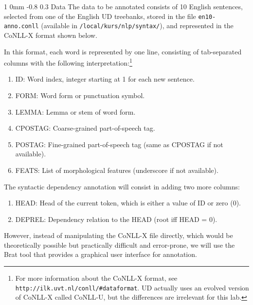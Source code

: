 \documentclass[10.9pt]{article}
\makeatletter
\newcommand{\newsec}[2]{\section{#1}\label{sec:#2}\noindent}
\renewcommand{\section}{\@startsection
{section}%
{1}%
{0mm}%
{-0.8\baselineskip}%
{0.3\baselineskip}%
{\bfseries\large}}%
\makeatother
\begin{document}
\newsec{Data}{data}%
The data to be annotated consists of 10 English sentences, selected from one of the English UD treebanks, stored in the file {\tt en10-anno.conll} 
(available in {\tt /local/kurs/nlp/syntax/}), and represented in the CoNLL-X format shown below.
\begin{center}
\fbox{

}
\end{center}
In this format, each word is represented by one line, consisting of tab-separated columns with the following interpretation:\footnote{For more information about the CoNLL-X format, see {\tt http://ilk.uvt.nl/conll/\#dataformat}. UD actually uses an evolved version of CoNLL-X called CoNLL-U, but the differences are irrelevant for this lab.} 
\begin{enumerate}[topsep=5pt,noitemsep]
\item ID: Word index, integer starting at 1 for each new sentence.
\item FORM: Word form or punctuation symbol.
\item LEMMA: Lemma or stem of word form.
\item CPOSTAG: Coarse-grained part-of-speech tag.
\item POSTAG: Fine-grained part-of-speech tag (same as CPOSTAG if not available).
\item FEATS: List of morphological features (underscore if not available).
\end{enumerate}
The syntactic dependency annotation will consist in adding two more columns:
\begin{enumerate}[topsep=5pt,noitemsep]
\item HEAD: Head of the current token, which is either a value of ID or zero (0).
\item DEPREL: Dependency relation to the HEAD (root iff HEAD = 0).
\end{enumerate}
However, instead of manipulating the CoNLL-X file directly, which would be theoretically possible but practically difficult and error-prone, we will use the Brat tool 
that provides a graphical user interface for annotation. 
\end{document}
